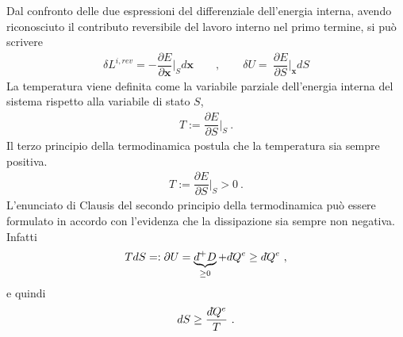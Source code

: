 \documentclass[letterpaper,10pt,english]{jupyterBook}
\begin{document}
\sphinxAtStartPar
Dal confronto delle due espressioni del differenziale dell’energia interna, avendo riconosciuto il contributo reversibile del lavoro interno nel primo termine, si può scrivere
\begin{equation*}
\begin{split}
  \delta L^{i,rev} = - \dfrac{\partial E}{\partial \mathbf{x}} \Big|_{S} d \mathbf{x}  \qquad , \qquad 
  \delta U         = \ \dfrac{\partial E}{\partial S} \Big|_{\mathbf{x}} d S 
\end{split}
\end{equation*}
\sphinxAtStartPar
{}
La temperatura viene definita come la variabile parziale dell’energia interna del sistema rispetto alla variabile di stato \(S\),
\begin{equation*}
\begin{split}T := \dfrac{\partial E}{\partial S}\Big|_S{} \ .\end{split}
\end{equation*}
\sphinxAtStartPar
Il terzo principio della termodinamica postula che la temperatura sia sempre positiva.
\begin{equation*}
\begin{split}T := \dfrac{\partial E}{\partial S}\Big|_S{} > 0 \ .\end{split}
\end{equation*}
\sphinxAtStartPar
{} L’enunciato di Clausis del secondo principio della termodinamica può essere formulato in accordo con l’evidenza che la dissipazione sia sempre non negativa. Infatti
\begin{equation*}
\begin{split}T dS =: \partial U = \underbrace{d\hspace{-0.08pt}\bar{}\hspace{0.1pt}^+ D}_{\ge 0} + d\hspace{-0.08pt}\bar{}\hspace{0.1pt} Q^e \ge  d\hspace{-0.08pt}\bar{}\hspace{0.1pt} Q^e \ ,\end{split}
\end{equation*}
\sphinxAtStartPar
e quindi
\begin{equation*}
\begin{split}dS \ge \dfrac{d\hspace{-0.08pt}\bar{}\hspace{0.1pt} Q^e }{T} \ .\end{split}
\end{equation*}
\sphinxAtStartPar
{}
\end{document}
